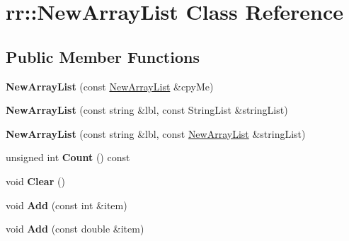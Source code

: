 \hypertarget{classrr_1_1_new_array_list}{\section{rr\-:\-:New\-Array\-List Class Reference}
\label{classrr_1_1_new_array_list}
}
\subsection*{Public Member Functions}
\begin{DoxyCompactItemize}
\item 
\hypertarget{classrr_1_1_new_array_list_aa99c9817ed6d3bd98724a533e0a0eca9}{{\bfseries New\-Array\-List} (const \hyperlink{classrr_1_1_new_array_list}{New\-Array\-List} \&cpy\-Me)}\label{classrr_1_1_new_array_list_aa99c9817ed6d3bd98724a533e0a0eca9}

\item 
\hypertarget{classrr_1_1_new_array_list_a845c63515002595b73f19970a377f259}{{\bfseries New\-Array\-List} (const string \&lbl, const String\-List \&string\-List)}\label{classrr_1_1_new_array_list_a845c63515002595b73f19970a377f259}

\item 
\hypertarget{classrr_1_1_new_array_list_af0a8e9ec9b7832305d35225668dd5752}{{\bfseries New\-Array\-List} (const string \&lbl, const \hyperlink{classrr_1_1_new_array_list}{New\-Array\-List} \&string\-List)}\label{classrr_1_1_new_array_list_af0a8e9ec9b7832305d35225668dd5752}

\item 
\hypertarget{classrr_1_1_new_array_list_ac2d0246d8a1f32e9ca5e724ed9d5dd98}{unsigned int {\bfseries Count} () const }\label{classrr_1_1_new_array_list_ac2d0246d8a1f32e9ca5e724ed9d5dd98}

\item 
\hypertarget{classrr_1_1_new_array_list_a569f548bc657f22398f8fb6a1b407fc1}{void {\bfseries Clear} ()}\label{classrr_1_1_new_array_list_a569f548bc657f22398f8fb6a1b407fc1}

\item 
\hypertarget{classrr_1_1_new_array_list_a476a7d04ee3fea3c9960a3f8909fd947}{void {\bfseries Add} (const int \&item)}\label{classrr_1_1_new_array_list_a476a7d04ee3fea3c9960a3f8909fd947}

\item 
\hypertarget{classrr_1_1_new_array_list_a0ebc5f7fc94a3c060400f234351b51e7}{void {\bfseries Add} (const double \&item)}\label{classrr_1_1_new_array_list_a0ebc5f7fc94a3c060400f234351b51e7}


\end{DoxyCompactItemize}
